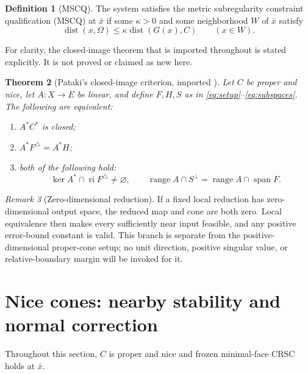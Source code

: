 \documentclass[11pt]{article}
\numberwithin{equation}{section}
\newtheorem{theorem}{Theorem}[section]
\theoremstyle{definition}
\newtheorem{definition}[theorem]{Definition}
\theoremstyle{remark}
\newtheorem{remark}[theorem]{Remark}
\DeclareMathOperator{\dist}{dist}
\DeclareMathOperator{\ri}{ri}
\DeclareMathOperator{\spann}{span}
\DeclareMathOperator{\range}{range}
\newcommand{\xb}{\bar x}
\newcommand{\dset}[2]{\dist(#1,#2)}
\begin{document}
\begin{definition}[MSCQ]
The system satisfies the metric subregularity constraint qualification
(MSCQ) at $\xb$ if some $\kappa>0$ and some neighborhood $W$ of $\xb$
satisfy
\begin{equation}
 \dset{x}{\Omega}\leq\kappa\dset{G(x)}{C}
 \qquad (x\in W).
 \label{eq:mscq}
\end{equation}
\end{definition}

For clarity, the closed-image theorem that is imported throughout is
stated explicitly. It is not proved or claimed as new here.

\begin{theorem}[Pataki's closed-image criterion, imported
{\citep[Theorem~1.1]{pataki2007}}]
\label{thm:pataki}
Let $C$ be proper and nice, let $A:X\to E$ be linear, and define $F,H,S$
as in \eqref{eq:setup}--\eqref{eq:subspaces}. The following are equivalent:
\begin{enumerate}[label=(\roman*)]
 \item $A^*C^*$ is closed;
 \item $A^*F^\triangle=A^*H$;
 \item both of the following hold:
 \begin{equation}
 \ker A^*\cap\ri F^\triangle\ne\varnothing,
 \qquad
 \range A\cap S^\perp=\range A\cap\spann F.
 \label{eq:pataki-kernel}
 \end{equation}
\end{enumerate}
\end{theorem}

\begin{remark}[Zero-dimensional reduction]
If a fixed local reduction has zero-dimensional output space, the reduced
map and cone are both zero. Local equivalence then makes every sufficiently
near input feasible, and any positive error-bound constant is valid.
This branch is separate from the positive-dimensional proper-cone setup;
no unit direction, positive singular value, or relative-boundary margin
will be invoked for it.
\end{remark}

\section{Nice cones: nearby stability and normal correction}
\label{sec:nice}

Throughout this section, $C$ is proper and nice and frozen minimal-face
CRSC holds at $\xb$.
\end{document}
